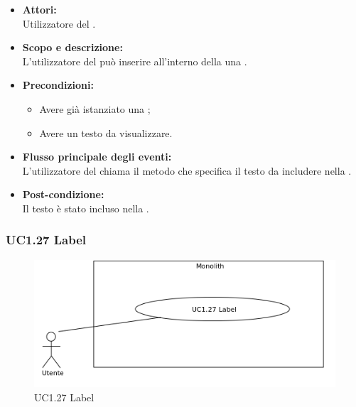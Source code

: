 \begin{itemize}
	\item \textbf{Attori:}
	\\Utilizzatore del .
	\item \textbf{Scopo e descrizione:} 
	\\L'utilizzatore del  può inserire all'interno della  una .
	\item \textbf{Precondizioni:}
	\begin{itemize}
		\item Avere già istanziato una ;
		\item Avere un testo da visualizzare.
	\end{itemize}
	\item \textbf{Flusso principale degli eventi:}
	\\L'utilizzatore del  chiama il metodo che specifica il testo da includere nella .
	\item \textbf{Post-condizione:}
	\\Il testo è stato incluso nella .
\end{itemize}

\subsubsection{UC1.27 Label} \label{UC1.27}

\begin{figure}[H]
	\centering
	\includegraphics[width=15cm]{../../documenti/AnalisiDeiRequisiti/Diagrammi_img/uc1_27.png}
	\caption{UC1.27 Label}
\end{figure}

